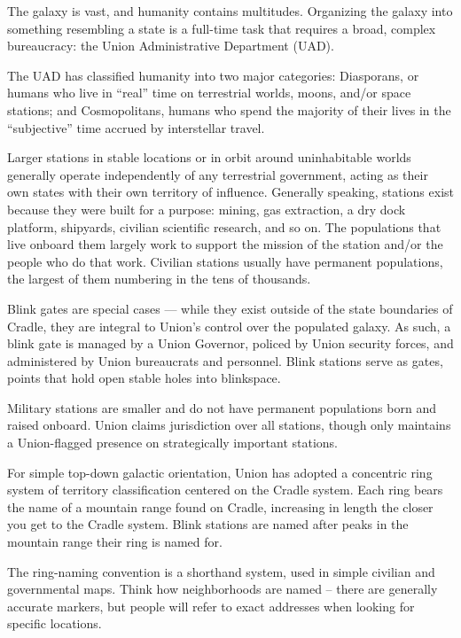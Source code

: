 The galaxy is vast, and humanity contains multitudes. Organizing the galaxy into something  
resembling a state is a full-time task that requires a broad, complex bureaucracy: the Union  
Administrative Department (UAD). 
 

The UAD has classified humanity into two major categories: Diasporans, or humans who live in  
“real” time on terrestrial worlds, moons, and/or space stations; and Cosmopolitans, humans who  
spend the majority of their lives in the “subjective” time accrued by interstellar travel. 
 

                                                                                                            


Larger stations in stable locations or in orbit around uninhabitable worlds generally operate  
independently of any terrestrial government, acting as their own states with their own territory of  
influence. Generally speaking, stations exist because they were built for a purpose: mining, gas  
extraction, a dry dock platform, shipyards, civilian scientific research, and so on. The populations  
that live onboard them largely work to support the mission of the station and/or the people who  
do that work. Civilian stations usually have permanent populations, the largest of them  
numbering in the tens of thousands. 
 

Blink gates are special cases — while they exist outside of the state boundaries of Cradle, they  
are integral to Union’s control over the populated galaxy. As such, a blink gate is managed by a  
Union Governor, policed by Union security forces, and administered by Union bureaucrats and  
personnel. Blink stations serve as gates, points that hold open stable holes into blinkspace.
 

Military stations are smaller and do not have permanent populations born and raised onboard.  
Union claims jurisdiction over all stations, though only maintains a Union-flagged presence on  
strategically important stations. 
 

For simple top-down galactic orientation, Union has adopted a concentric ring system of territory  
classification centered on the Cradle system. Each ring bears the name of a mountain range  
found on Cradle, increasing in length the closer you get to the Cradle system. Blink stations are  
named after peaks in the mountain range their ring is named for. 
 

The ring-naming convention is a shorthand system, used in simple civilian and governmental  
maps. Think how neighborhoods are named -- there are generally accurate markers, but people  
will refer to exact addresses when looking for specific locations.   

